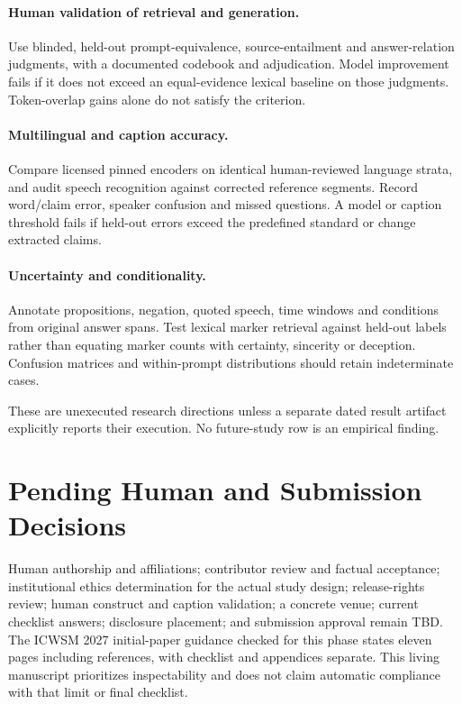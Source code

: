 \paragraph{Human validation of retrieval and generation.} Use blinded, held-out prompt-equivalence, source-entailment and answer-relation judgments, with a documented codebook and adjudication. Model improvement fails if it does not exceed an equal-evidence lexical baseline on those judgments. Token-overlap gains alone do not satisfy the criterion.

\paragraph{Multilingual and caption accuracy.} Compare licensed pinned encoders on identical human-reviewed language strata, and audit speech recognition against corrected reference segments. Record word/claim error, speaker confusion and missed questions. A model or caption threshold fails if held-out errors exceed the predefined standard or change extracted claims.

\paragraph{Uncertainty and conditionality.} Annotate propositions, negation, quoted speech, time windows and conditions from original answer spans. Test lexical marker retrieval against held-out labels rather than equating marker counts with certainty, sincerity or deception. Confusion matrices and within-prompt distributions should retain indeterminate cases.

These are unexecuted research directions unless a separate dated result artifact explicitly reports their execution. No future-study row is an empirical finding.

\section{Pending Human and Submission Decisions}
Human authorship and affiliations; contributor review and factual acceptance; institutional ethics determination for the actual study design; release-rights review; human construct and caption validation; a concrete venue; current checklist answers; disclosure placement; and submission approval remain TBD. The ICWSM 2027 initial-paper guidance checked for this phase states eleven pages including references, with checklist and appendices separate. This living manuscript prioritizes inspectability and does not claim automatic compliance with that limit or final checklist.

